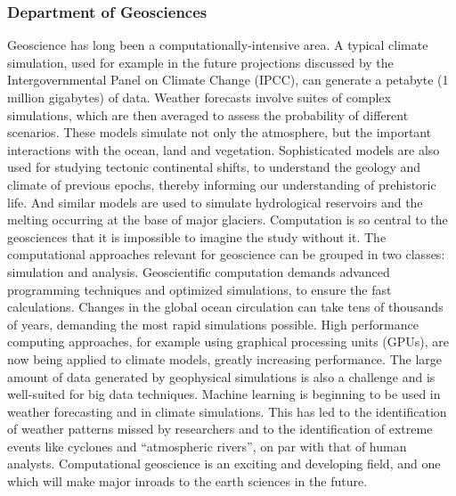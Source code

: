 \documentclass[a4paper,10pt]{article}
\begin{document}
\subsubsection*{Department of  Geosciences}
Geoscience has long been a computationally-intensive area. A typical climate simulation, used for example in the future projections discussed by the Intergovernmental Panel on Climate Change (IPCC), can generate a petabyte (1 million gigabytes) of data. Weather forecasts involve suites of complex simulations, which are then averaged to assess the probability of different scenarios. These models simulate not only the atmosphere, but the important interactions with the ocean, land and vegetation. Sophisticated models are also used for studying tectonic continental shifts, to understand the geology and climate of previous epochs, thereby informing our understanding of prehistoric life. And similar models are used to simulate hydrological reservoirs and the melting occurring at the base of major glaciers. Computation is so central to the geosciences that it is impossible to imagine the study without it.
The computational approaches relevant for geoscience can be grouped in two classes: simulation and analysis. Geoscientific computation demands advanced programming techniques and optimized simulations, to ensure the fast calculations. Changes in the global ocean circulation can take tens of thousands of years, demanding the most rapid simulations possible. High performance computing approaches, for example using graphical processing units (GPUs), are now being applied to climate models, greatly increasing performance. The large amount of data generated by geophysical simulations is also a challenge and is well-suited for big data techniques. Machine learning is beginning to be used in weather forecasting and in climate simulations. This has led to the identification of weather patterns missed by researchers and to the identification of extreme events like cyclones and “atmospheric rivers”, on par with that of human analysts. Computational geoscience is an exciting and developing field, and one which will make major inroads to the earth sciences in the future.
\end{document}

